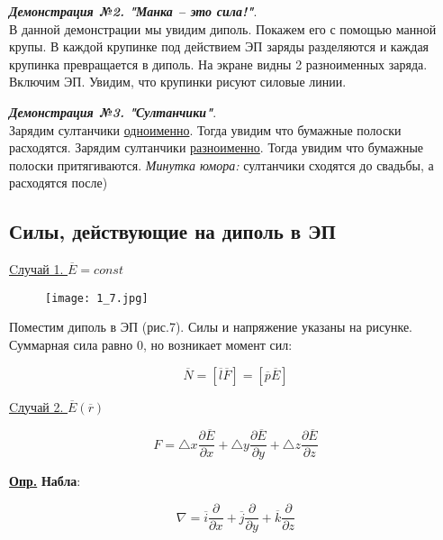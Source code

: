 \large
\textbf{\textit{Демонстрация №2. "Манка -- это сила!"}}.\\
\normalsize
В данной демонстрации мы увидим диполь. Покажем его с помощью манной крупы. В каждой крупинке под действием ЭП заряды разделяются и каждая крупинка превращается в диполь. На экране видны 2 разноименных заряда. Включим ЭП.
Увидим, что крупинки рисуют силовые линии. 

\large
\textbf{\textit{Демонстрация №3. "Султанчики"}}.\\
\normalsize
Зарядим султанчики \underline{одноименно}. Тогда увидим что бумажные полоски расходятся. 
Зарядим султанчики \underline{разноименно}. Тогда увидим что бумажные полоски притягиваются.
\textit{Минутка юмора:} султанчики сходятся до свадьбы, а расходятся после) 

\subsection{Силы, действующие на диполь в ЭП}

\underline{Cлучай 1. $\overline{E} = const$}

\begin{figure}[!ht]
\centering
 \texttt{[image: 1\_7.jpg]}     
 \label{fig:my_label}
 \caption{}
\end{figure}

Поместим диполь в ЭП (рис.7). Силы и напряжение указаны на рисунке. Суммарная сила равно 0, но возникает момент сил:

\begin{equation}\label{opr7}
\overline{N} = [\overline{l} \overline{F}] = [\overline{p} \overline{E}]
\end{equation}



\underline{Cлучай 2. $\overline{E} (\overline{r})$}

\begin{equation}\label{opr8}
F = \triangle x \frac{\partial \overline{E}}{\partial x} + \triangle y \frac{\partial \overline{E}}{\partial y} + \triangle z \frac{\partial \overline{E}}{\partial z}
\end{equation}

\colorbox{faded}{\underline{\textbf{Опр.}}} \textbf{Набла}:

\begin{equation}\label{opr9}
\nabla = \overline{i}  \frac{\partial}{\partial x} + \overline{j} \frac{\partial}{\partial y} + \overline{k} \frac{\partial}{\partial z}
\end{equation}


